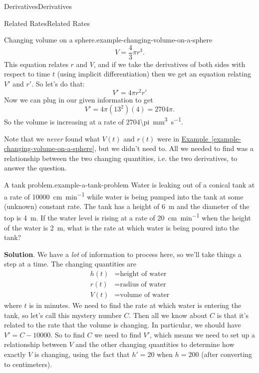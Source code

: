 \documentclass[10pt,]{book}
\numberwithin{equation}{section}
\begin{document}
\begin{chapterptx}{Derivatives}{}{Derivatives}{}{}
\begin{sectionptx}{Related Rates}{}{Related Rates}{}{}
\begin{example}{Changing volume on a sphere.}{example-changing-volume-on-a-sphere}
\begin{equation*}
V = \frac{4}{3}\pi r^{3}.
\end{equation*}
This equation relates \(r\) and \(V\), and if we take the derivatives of both sides with respect to time \(t\) (using implicit differentiation) then we get an equation relating \(V'\) and \(r'\). So let's do that:%
\begin{equation*}
V' = 4\pi r^{2}r'
\end{equation*}
Now we can plug in our given information to get%
\begin{equation*}
V' = 4\pi(13^{2})(4) = 2704\pi.
\end{equation*}
So the volume is increasing at a rate of \SI{2704\pi}{\milli\meter\tothe{3}\per\second}.%
\end{example}
\hypertarget{p-171}{}%
Note that we \emph{never} found what \(V(t)\) and \(r(t)\) were in \hyperref[example-changing-volume-on-a-sphere]{Example~\ref{example-changing-volume-on-a-sphere}}, but we didn't need to. All we needed to find was a relationship between the two changing quantities, i.e. the two derivatives, to answer the question.%
\begin{example}{A tank problem.}{example-a-tank-problem}%
\hypertarget{p-172}{}%
Water is leaking out of a conical tank at a rate of \SI{10000}{\centi\meter\per\minute} while water is being pumped into the tank at some (unknown) constant rate. The tank has a height of \SI{6}{\meter} and the diameter of the top is \SI{4}{\meter}. If the water level is rising at a rate of \SI{20}{\centi\meter\per\minute} when the height of the water is \SI{2}{\meter}, what is the rate at which water is being poured into the tank?%
\par\smallskip%
\noindent\textbf{Solution}.\hypertarget{solution-38}{}\quad%
\hypertarget{p-173}{}%
We have a \emph{lot} of information to process here, so we'll take things a step at a time. The changing quantities are%
\begin{align*}
h(t) & = \text{height of water} \\
r(t) & = \text{radius of water} \\
V(t) & = \text{volume of water} 
\end{align*}
where \(t\) is in minutes. We need to find the rate at which water is entering the tank, so let's call this mystery number \(C\). Then all we know about \(C\) is that it's related to the rate that the volume is changing. In particular, we should have \(V' = C - 10000\). So to find \(C\) we need to find \(V'\), which means we need to set up a relationship between \(V\) and the other changing quantities to determine how exactly \(V\) is changing, using the fact that \(h' = 20\) when \(h=200\) (after converting to centimeters).%

\end{example}
\end{sectionptx}
\end{chapterptx}
\end{document}
